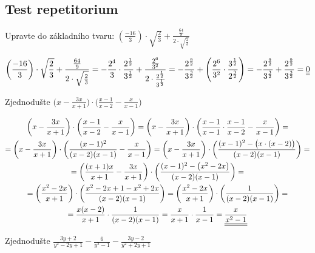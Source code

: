 \subsection*{Test repetitorium} 
\begin{example}
    Upravte do základního tvaru: $\left(
        \frac{-16}{3}
    \right) \cdot 
    \sqrt{
        \frac{2}{3}} + 
        \frac{\frac{64}{9}}
        {2\cdot\sqrt{\frac{2}{3}}}$
\end{example}
\begin{gather*}
    \left(
        \frac{-16}{3}
    \right) \cdot 
    \sqrt{
        \frac{2}{3}} + 
        \frac{\frac{64}{9}}
        {2\cdot\sqrt{\frac{2}{3}}} = 
         - \frac{2^4}{3} \cdot \frac{2^\frac{1}{2}}{3^\frac{1}{2}} + \frac{\frac{2^6}{3^2}}{2 \cdot \frac{2^\frac{1}{2}}{3^\frac{1}{2}}} 
        = - \frac{2^\frac{9}{2}}{3^\frac{3}{2}} + \left( \frac{2^6}{3^2} \cdot \frac{3^\frac{1}{2}}{2^\frac{3}{2}} \right)
        = - \frac{2^\frac{9}{2}}{3^\frac{3}{2}} + \frac{2^\frac{9}{2}}{3^\frac{3}{2}} = \underline{\underline{0}}
\end{gather*}
\begin{example}
    Zjednodušte $\biggl( x-\frac{3x}{x+1} \biggr)\cdot 
    \biggl( \frac{x-1}{x-2} - \frac{x}{x-1} \biggr) $
\end{example}
\begin{gather*}
    \biggl( x-\frac{3x}{x+1} \biggr)\cdot 
    \biggl( \frac{x-1}{x-2} - \frac{x}{x-1} \biggr) = 
    \biggl( x-\frac{3x}{x+1} \biggr)\cdot 
    \biggl(\frac{x-1}{x-1} \cdot \frac{x-1}{x-2} - \frac{x}{x-1} \biggr) = \\
     = \biggl( x-\frac{3x}{x+1} \biggr)\cdot 
    \biggl( \frac{(x-1)^2}{(x-2)(x-1)} - \frac{x}{x-1} \biggr) = 
    \biggl( x-\frac{3x}{x+1} \biggr)\cdot 
    \biggl( \frac{(x-1)^2 - \bigl(x \cdot (x-2)\bigr)}{(x-2)(x-1)}\biggr) =
    \\  
    = \biggl(\frac{(x+1)x}{x+1} -\frac{3x}{x+1} \biggr)\cdot 
    \biggl( \frac{(x-1)^2 - \bigl(x^2-2x\bigr)}{(x-2)(x-1)}\biggr) =
    \\
    = \biggl(
        \frac{x^2-2x}{x+1} 
    \biggr) \cdot 
    \biggl(
        \frac{x^2-2x+1-x^2+2x}{(x-2)(x-1)}
    \biggr) = \biggl(
        \frac{x^2-2x}{x+1}
    \biggr) \cdot \biggl(
        \frac{1}{(x-2)(x-1)}
    \biggr) = \\=   \frac{x(x-2)}{x+1}  \cdot \frac{1}{(x-2)(x-1)} = \frac{x}{x+1} \cdot \frac{1}{x-1} = \underline{\underline{\frac{x}{x^2-1}}}
\end{gather*}
\begin{example}
    Zjednodušte $\frac{3y+2}{y^2-2y+1} - \frac{6}{y^2-1} - \frac{3y-2}{y^2+2y+1}$
\end{example} 
